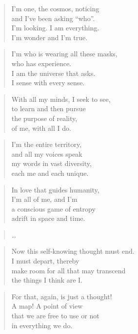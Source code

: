 \documentclass[14pt,a4paper]{article}
\begin{document}
\begin{verse}
I’m one, the cosmos, noticing\\
and I’ve been asking “who”.\\
I’m looking. I am everything.\\
I’m wonder and I’m true.
\end{verse}

\begin{verse}
I’m who is wearing all these masks,\\
who has experience.\\
I am the universe that asks.\\
I sense with every sense.
\end{verse}

\begin{verse}
With all my minds, I seek to see,\\
to learn and then pursue\\
the purpose of reality,\\
of me, with all I do.
\end{verse}

\begin{verse}
I’m the entire territory,\\
and all my voices speak\\
my words in vast diversity,\\
each me and each unique.
\end{verse}

\begin{verse}
In love that guides humanity,\\
I’m all of me, and I’m\\
a conscious game of entropy\\
adrift in space and time.
\end{verse}

\begin{verse}
…
\end{verse}

\begin{verse}
Now this self-knowing thought must end.\\
I must depart, thereby\\
make room for all that may transcend\\
the things I think are I.
\end{verse}

\begin{verse}
For that, again, is just a thought!\\
A map! A point of view\\
that we are free to use or not\\
in everything we do.
\end{verse}
\end{document}
